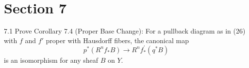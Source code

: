 \newpage
\section*{Section 7}
7.1 Prove Corollary 7.4 (Proper Base Change): For a pullback diagram as in (26) with $f$ and $f'$ proper with Hausdorff fibers, the canonical map 
\[ p^*(R^nf_*B) \rightarrow R^nf_*^{'}(q^*B)\]
is an isomorphism for any sheaf $B$ on $Y$. 